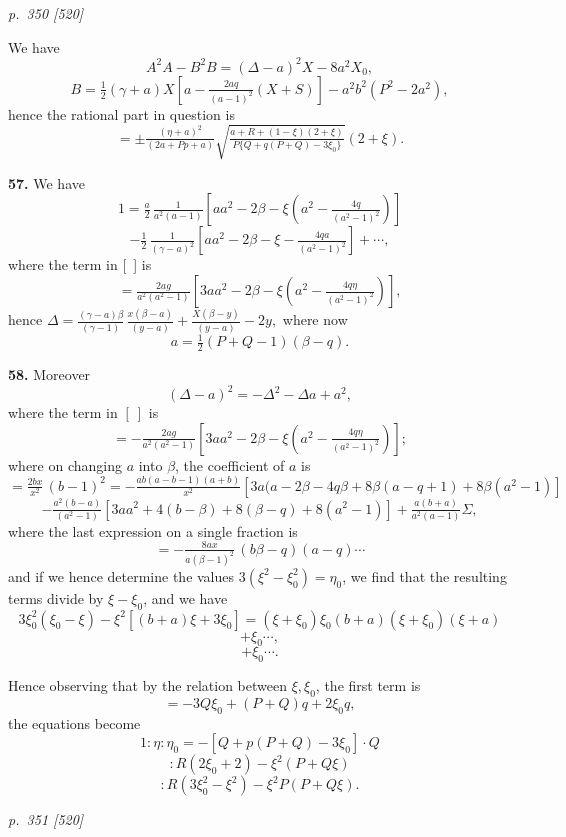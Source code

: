 \documentclass[11pt,a4paper]{article}
\theoremstyle{plain}
\theoremstyle{definition}
\begin{document}
\clearpage

\bigskip
\textit{p.~350 [520]}
\smallskip

We have
\[
A^2A - B^2B = (\Delta - a)^2 X - 8a^2 X_0,
\]
\[
B = \tfrac{1}{2}(\gamma + a)X\!\left[a - \tfrac{2aq}{(a - 1)^2}(X + S)\right] - a^2 b^2(P^2 - 2a^2),
\]
hence the rational part in question is
\[
= \pm \tfrac{(\eta + a)^2}{(2a + Pp + a)}\sqrt{\tfrac{a + R + (1 - \xi)(2 + \xi)}{P\{Q + q(P + Q) - 3\xi_0\}}}(2 + \xi).
\]

\textbf{57.} We have
\[
1 = \tfrac{a}{2}\,\tfrac{1}{a^2(a - 1)}\!\left[a a^2 - 2\beta - \xi\!\left(a^2 - \tfrac{4q}{(a^2 - 1)^2}\right)\right]
\]
\[
- \tfrac{1}{2}\,\tfrac{1}{(\gamma - a)^2}\!\left[a a^2 - 2\beta - \xi - \tfrac{4qa}{(a^2 - 1)^2}\right] + \cdots,
\]
where the term in [\ ] is
\[
= \tfrac{2ag}{a^2(a^2 - 1)}\!\left[3a a^2 - 2\beta - \xi\!\left(a^2 - \tfrac{4q\eta}{(a^2 - 1)^2}\right)\right],
\]
hence $\Delta = \tfrac{(\gamma - a)\beta}{(\gamma - 1)}\,\tfrac{x(\beta - a)}{(y - a)} + \tfrac{X(\beta - y)}{(y - a)} - 2y,$
where now
\[
a = \tfrac{1}{2}(P + Q - 1)(\beta - q).
\]

\textbf{58.} Moreover
\[
(\Delta - a)^2 = -\Delta^2 - \Delta a + a^2,
\]
where the term in $[\ ]$ is
\[
= -\tfrac{2ag}{a^2(a^2 - 1)}\!\left[3a a^2 - 2\beta - \xi\!\left(a^2 - \tfrac{4q\eta}{(a^2 - 1)^2}\right)\right];
\]
where on changing $a$ into $\beta$, the coefficient of $a$ is
\[
= \tfrac{2bx}{x^2}\,(b - 1)^2 = -\tfrac{ab(a - b - 1)(a + b)}{x^2}\!\left[3a(a - 2\beta - 4q\beta + 8\beta(a - q + 1) + 8\beta(a^2 - 1)\right]
\]
\[
- \tfrac{a^2(b - a)}{(a^2 - 1)}\!\left[3a a^2 + 4(b - \beta) + 8(\beta - q) + 8(a^2 - 1)\right] + \tfrac{a(b + a)}{a^2(a - 1)}\Sigma,
\]
where the last expression on a single fraction is
\[
= -\tfrac{8ax}{a(\beta - 1)^2}\,(b\beta - q)(a - q)\cdots
\]
and if we hence determine the values $3(\xi^2 - \xi_0^2) = \eta_0$, we find that the resulting terms divide by $\xi - \xi_0$, and we have
\[
3\xi_0^2(\xi_0 - \xi) - \xi^2[(b + a)\xi + 3\xi_0] = (\xi + \xi_0)\xi_0(b + a)(\xi + \xi_0)(\xi + a)
\]
\[
+ \xi_0 \cdots,
\]
\[
+ \xi_0 \cdots.
\]

Hence observing that by the relation between $\xi, \xi_0$, the first term is
\[
= -3Q\xi_0 + (P + Q)q + 2\xi_0 q,
\]
the equations become
\[
1: \eta : \eta_0 = -[Q + p(P + Q) - 3\xi_0] \cdot Q
\]
\[
: R(2\xi_0 + 2) - \xi^2(P + Q\xi)
\]
\[
: R(3\xi_0^2 - \xi^2) - \xi^2 P(P + Q\xi).
\]

\clearpage

\bigskip
\textit{p.~351 [520]}
\smallskip
\end{document}
